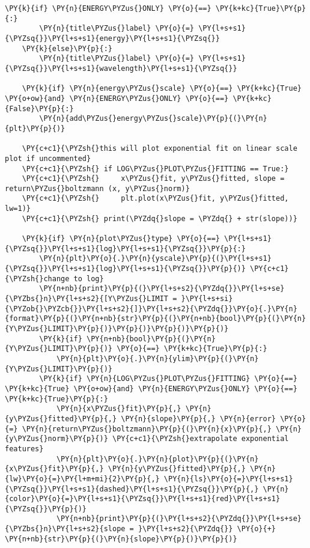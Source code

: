 \begin{tcolorbox}[breakable, size=fbox, boxrule=1pt, pad at break*=1mm,colback=cellbackground, colframe=cellborder]
\begin{Verbatim}[commandchars=\\\{\}]
    \PY{k}{if} \PY{n}{ENERGY\PYZus{}ONLY} \PY{o}{==} \PY{k+kc}{True}\PY{p}{:}
        \PY{n}{title\PYZus{}label} \PY{o}{=} \PY{l+s+s1}{\PYZsq{}}\PY{l+s+s1}{energy}\PY{l+s+s1}{\PYZsq{}}
    \PY{k}{else}\PY{p}{:}
        \PY{n}{title\PYZus{}label} \PY{o}{=} \PY{l+s+s1}{\PYZsq{}}\PY{l+s+s1}{wavelength}\PY{l+s+s1}{\PYZsq{}}
    
    \PY{k}{if} \PY{n}{energy\PYZus{}scale} \PY{o}{==} \PY{k+kc}{True} \PY{o+ow}{and} \PY{n}{ENERGY\PYZus{}ONLY} \PY{o}{==} \PY{k+kc}{False}\PY{p}{:}
        \PY{n}{add\PYZus{}energy\PYZus{}scale}\PY{p}{(}\PY{n}{plt}\PY{p}{)}
        
    \PY{c+c1}{\PYZsh{}this will plot exponential fit on linear scale plot if uncommented}
    \PY{c+c1}{\PYZsh{} if LOG\PYZus{}PLOT\PYZus{}FITTING == True:}
    \PY{c+c1}{\PYZsh{}     x\PYZus{}fit, y\PYZus{}fitted, slope = return\PYZus{}boltzmann (x, y\PYZus{}norm)}
    \PY{c+c1}{\PYZsh{}     plt.plot(x\PYZus{}fit, y\PYZus{}fitted, lw=1)}
    \PY{c+c1}{\PYZsh{} print(\PYZdq{}slope = \PYZdq{} + str(slope))}
        
    \PY{k}{if} \PY{n}{plot\PYZus{}type} \PY{o}{==} \PY{l+s+s1}{\PYZsq{}}\PY{l+s+s1}{log}\PY{l+s+s1}{\PYZsq{}}\PY{p}{:}
        \PY{n}{plt}\PY{o}{.}\PY{n}{yscale}\PY{p}{(}\PY{l+s+s1}{\PYZsq{}}\PY{l+s+s1}{log}\PY{l+s+s1}{\PYZsq{}}\PY{p}{)} \PY{c+c1}{\PYZsh{}change to log}
        \PY{n+nb}{print}\PY{p}{(}\PY{l+s+s2}{\PYZdq{}}\PY{l+s+se}{\PYZbs{}n}\PY{l+s+s2}{[Y\PYZus{}LIMIT = }\PY{l+s+si}{\PYZob{}\PYZcb{}}\PY{l+s+s2}{]}\PY{l+s+s2}{\PYZdq{}}\PY{o}{.}\PY{n}{format}\PY{p}{(}\PY{n+nb}{str}\PY{p}{(}\PY{n+nb}{bool}\PY{p}{(}\PY{n}{Y\PYZus{}LIMIT}\PY{p}{)}\PY{p}{)}\PY{p}{)}\PY{p}{)}
        \PY{k}{if} \PY{n+nb}{bool}\PY{p}{(}\PY{n}{Y\PYZus{}LIMIT}\PY{p}{)} \PY{o}{==} \PY{k+kc}{True}\PY{p}{:}
            \PY{n}{plt}\PY{o}{.}\PY{n}{ylim}\PY{p}{(}\PY{n}{Y\PYZus{}LIMIT}\PY{p}{)}   
        \PY{k}{if} \PY{n}{LOG\PYZus{}PLOT\PYZus{}FITTING} \PY{o}{==} \PY{k+kc}{True} \PY{o+ow}{and} \PY{n}{ENERGY\PYZus{}ONLY} \PY{o}{==} \PY{k+kc}{True}\PY{p}{:}
            \PY{n}{x\PYZus{}fit}\PY{p}{,} \PY{n}{y\PYZus{}fitted}\PY{p}{,} \PY{n}{slope}\PY{p}{,} \PY{n}{error} \PY{o}{=} \PY{n}{return\PYZus{}boltzmann}\PY{p}{(}\PY{n}{x}\PY{p}{,} \PY{n}{y\PYZus{}norm}\PY{p}{)} \PY{c+c1}{\PYZsh{}extrapolate exponential features}
            \PY{n}{plt}\PY{o}{.}\PY{n}{plot}\PY{p}{(}\PY{n}{x\PYZus{}fit}\PY{p}{,} \PY{n}{y\PYZus{}fitted}\PY{p}{,} \PY{n}{lw}\PY{o}{=}\PY{l+m+mi}{2}\PY{p}{,} \PY{n}{ls}\PY{o}{=}\PY{l+s+s1}{\PYZsq{}}\PY{l+s+s1}{dashed}\PY{l+s+s1}{\PYZsq{}}\PY{p}{,} \PY{n}{color}\PY{o}{=}\PY{l+s+s1}{\PYZsq{}}\PY{l+s+s1}{red}\PY{l+s+s1}{\PYZsq{}}\PY{p}{)} 
            \PY{n+nb}{print}\PY{p}{(}\PY{l+s+s2}{\PYZdq{}}\PY{l+s+se}{\PYZbs{}n}\PY{l+s+s2}{slope = }\PY{l+s+s2}{\PYZdq{}} \PY{o}{+} \PY{n+nb}{str}\PY{p}{(}\PY{n}{slope}\PY{p}{)}\PY{p}{)}
            

\end{Verbatim}
\end{tcolorbox}
